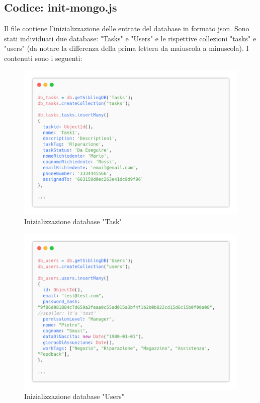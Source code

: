 \documentclass{report}
\begin{document}
\subsection*{Codice: init-mongo.js}

Il file contiene l'inizializzazione delle entrate del database in formato json. Sono stati individuati due database: "Tasks" e "Users" e le rispettive collezioni "tasks" e "users" (da notare la differenza della prima lettera da maiuscola a minuscola). I contenuti sono i seguenti:
\begin{figure}[H]
	\centering\includegraphics[width=1\textwidth]{images/db-tasks.png}
	Inizializzazione database "Task"
\end{figure}

\begin{figure}[H]
	\centering\includegraphics[width=1\textwidth]{images/db-users.png}
	Inizializzazione database "Users"
\end{figure}
\end{document}
